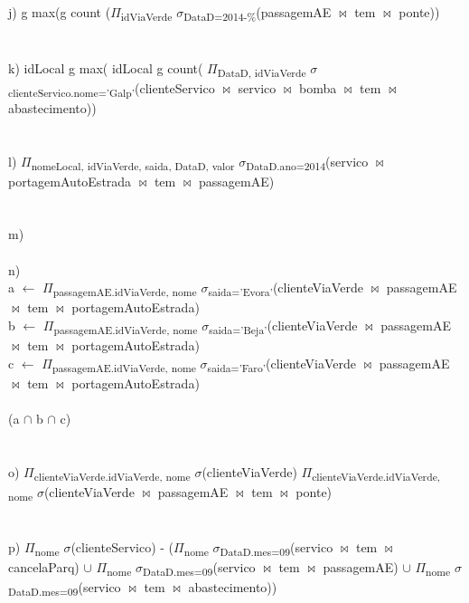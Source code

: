 \documentclass[a4paper]{article}
\begin{document}
\\
\\
\noindent j)
\indent g max(g count ($\Pi$\textsubscript{idViaVerde} $\sigma$\textsubscript{DataD=2014-\%}(passagemAE $\bowtie$ tem $\bowtie$ ponte))\\
\\
\\
\noindent k)
\indent idLocal g max( idLocal g count( $\Pi$\textsubscript{DataD, idViaVerde} $\sigma$\textsubscript{clienteServico.nome='Galp'}(clienteServico $\bowtie$ servico $\bowtie$ bomba $\bowtie$ tem $\bowtie$ abastecimento))\\
\\
\\
\noindent l)
\indent $\Pi$\textsubscript{nomeLocal, idViaVerde, saida, DataD, valor} $\sigma$\textsubscript{DataD.ano=2014}(servico $\bowtie$ portagemAutoEstrada $\bowtie$ tem $\bowtie$ passagemAE)\\
\\
\\
\noindent m)
\indent \\
\\
\newpage
\noindent n)\\
a $\leftarrow$ $\Pi$\textsubscript{passagemAE.idViaVerde, nome} $\sigma$\textsubscript{saida='Evora'}(clienteViaVerde $\bowtie$ passagemAE $\bowtie$ tem $\bowtie$ portagemAutoEstrada)\\
b $\leftarrow$ $\Pi$\textsubscript{passagemAE.idViaVerde, nome} $\sigma$\textsubscript{saida='Beja'}(clienteViaVerde $\bowtie$ passagemAE $\bowtie$ tem $\bowtie$ portagemAutoEstrada)\\
c $\leftarrow$ $\Pi$\textsubscript{passagemAE.idViaVerde, nome} $\sigma$\textsubscript{saida='Faro'}(clienteViaVerde $\bowtie$ passagemAE $\bowtie$ tem $\bowtie$ portagemAutoEstrada)\\
\\
(a $\cap$ b $\cap$ c)\\
\\
\\
\noindent o)
\indent $\Pi$\textsubscript{clienteViaVerde.idViaVerde, nome} $\sigma$(clienteViaVerde) \- $\Pi$\textsubscript{clienteViaVerde.idViaVerde, nome} $\sigma$(clienteViaVerde $\bowtie$ passagemAE $\bowtie$ tem $\bowtie$ ponte)\\
\\
\\
\noindent p)
\indent $\Pi$\textsubscript{nome} $\sigma$(clienteServico) - ($\Pi$\textsubscript{nome} $\sigma$\textsubscript{DataD.mes=09}(servico $\bowtie$ tem $\bowtie$ cancelaParq) $\cup$ $\Pi$\textsubscript{nome} $\sigma$\textsubscript{DataD.mes=09}(servico $\bowtie$ tem $\bowtie$ passagemAE) $\cup$ $\Pi$\textsubscript{nome} $\sigma$\textsubscript{DataD.mes=09}(servico $\bowtie$ tem $\bowtie$ abastecimento))\\
\\
\\
\end{document}
